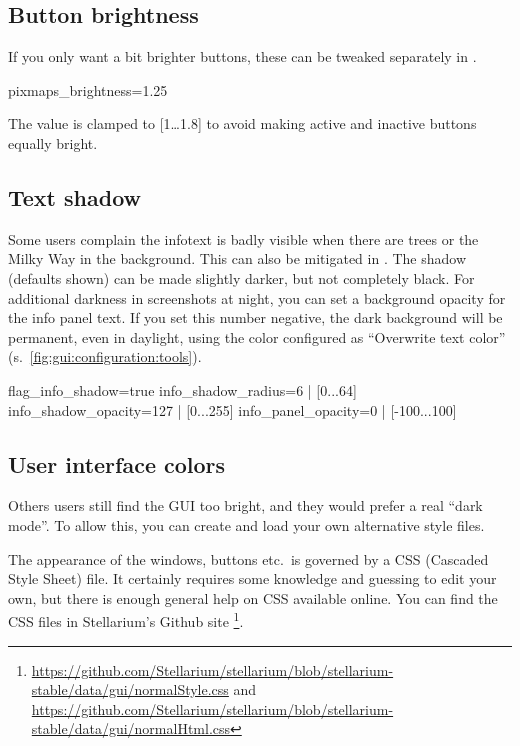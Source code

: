 \subsection{Button brightness}
\label{sec:CommandLineOptions:Special:ButtonBrightness}
If you only want a bit brighter buttons, these can be tweaked separately in .
\begin{configfile}
[gui]
pixmaps_brightness=1.25
\end{configfile}
The value is clamped to [1\ldots1.8] to avoid making active and inactive buttons equally bright.

\subsection{Text shadow}
\label{sec:CommandLineOptions:Special:TextShadow}
Some users complain the infotext is badly visible when there are trees or the Milky Way in the background. This can also be mitigated in .
The shadow (defaults shown) can be made slightly darker, but not completely black.
For additional darkness in screenshots at night, you can set a background opacity for the info panel text.
If you set this number negative, the dark background will be permanent, even in daylight, 
using the color configured as ``Overwrite text color'' (s.~\ref{fig:gui:configuration:tools}).
\begin{configfile}
[gui]
flag_info_shadow=true
info_shadow_radius=6      | [0...64]
info_shadow_opacity=127   | [0...255]
info_panel_opacity=0      | [-100...100]
\end{configfile}


\subsection{User interface colors}
\label{sec:CommandLineOptions:Special:CSS}
Others users still find the GUI too bright, and they would prefer a
real ``dark mode''. To allow this, you can create and load your own alternative style files.

The appearance of the windows, buttons etc.\ is governed by a CSS
(Cascaded Style Sheet) file. It certainly requires some knowledge and
guessing to edit your own, but there is enough general help on CSS available
online. You can find the CSS files in Stellarium's Github site%
\footnote{\url{https://github.com/Stellarium/stellarium/blob/stellarium-stable/data/gui/normalStyle.css} and
  \url{https://github.com/Stellarium/stellarium/blob/stellarium-stable/data/gui/normalHtml.css}}.


